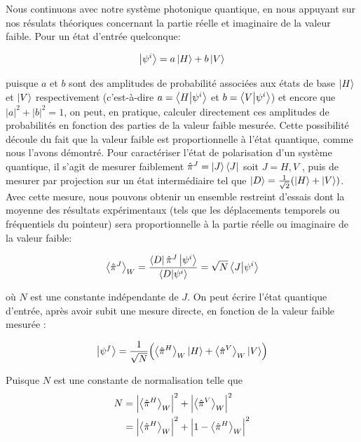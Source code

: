 \begin{onehalfspace}
    Nous continuons avec notre système photonique quantique, en nous 
    appuyant sur nos résulats théoriques concernant la partie réelle et 
    imaginaire de la valeur faible. Pour un 
    état d’entrée quelconque:

    \begin{equation}
        \ket{\psi^{i}} = a\ket{H} + b\ket{V} 
    \end{equation}

     \noindent puisque $a$ et $b$ sont des amplitudes de probabilité 
     associées aux états de base $\ket{H}$ et $\ket{V}$ respectivement 
     (c'est-à-dire $a=\bra{H}\ket{\psi^{i}}$ et $b=\bra{V}\ket{\psi^{i}}$)
     et encore que $|a|^2 + |b|^2 = 1$, on peut, en pratique, calculer directement ces amplitudes de 
     probabilités en fonction des parties de la valeur faible mesurée. Cette 
     possibilité découle du fait que la valeur faible est proportionnelle 
     à l'état quantique, comme nous l'avons démontré. Pour caractériser 
     l'état de polarisation d'un système quantique, il s'agit de mesurer 
     faiblement $\hat{\pi}^J = \ket{J}\bra{J}$ soit $J= H,V$ \cite{Hairiri,Lundeen_Direct_Measurement,Lundeen_Bamber}, 
     puis de mesurer par projection sur un état intermédiaire tel que 
     $\ket{D} = \frac{1}{\sqrt{2}}(\ket{H}+\ket{V})$. Avec cette
     mesure, nous pouvons obtenir un ensemble restreint d’essais 
     dont la moyenne des résultats expérimentaux (tels que les 
     déplacements temporels ou fréquentiels du pointeur) sera 
     proportionnelle à la partie réelle ou imaginaire de la valeur 
     faible:
    
     \begin{equation}
        \expval{\hat{\pi}^{J}}_W = \frac{\bra{D}\hat{\pi}^{J}\ket{\psi^{i}}}{\bra{D}\ket{\psi^{i}}} = \sqrt{N}\bra{J}\ket{\psi^{i}}\label{eq:weak_value_J}
    \end{equation}

    \noindent où $N$ est une constante indépendante de 
    $J$. On peut écrire l’état quantique d'entrée, après avoir subit une mesure directe, 
    en fonction de la valeur faible mesurée \cite{Lundeen_Direct_Measurement}: 

    \begin{equation}
        \ket{\psi^{f}} = \frac{1}{\sqrt{N}}\Bigl(\expval{\hat{\pi}^{H}}_W\ket{H}+\expval{\hat{\pi}^{V}}_W\ket{V}\Bigr)
    \end{equation}

    \noindent Puisque $N$ est une constante de normalisation telle que
    \begin{align}
        N &= \Bigl|\expval{\hat{\pi}^{H}}_W\Bigr|^2 + \Bigl|\expval{\hat{\pi}^{V}}_W\Bigr|^2\\
          &= \Bigl|\expval{\hat{\pi}^{H}}_W\Bigr|^2 + \Bigl|1- \expval{\hat{\pi}^{H}}_W\Bigr|^2
    \end{align}


\end{onehalfspace}
